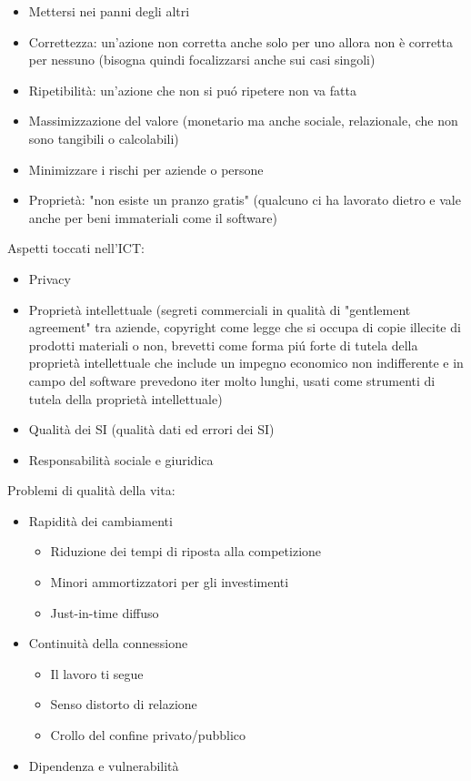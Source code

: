 \begin{itemize}

\item
  Mettersi nei panni degli altri
\item
  Correttezza: un'azione non corretta anche solo per uno allora non \`e
  corretta per nessuno (bisogna quindi focalizzarsi anche sui casi
  singoli)
\item
  Ripetibilit\`a: un'azione che non si pu\'o ripetere non va fatta
\item
  Massimizzazione del valore (monetario ma anche sociale, relazionale,
  che non sono tangibili o calcolabili)
\item
  Minimizzare i rischi per aziende o persone
\item
  Propriet\`a: "non esiste un pranzo gratis" (qualcuno ci ha lavorato
  dietro e vale anche per beni immateriali come il software)
\end{itemize}

Aspetti toccati nell'ICT:

\begin{itemize}

\item
  Privacy
\item
  Propriet\`a intellettuale (segreti commerciali in qualit\`a di
  "gentlement agreement" tra aziende, copyright come legge che si
  occupa di copie illecite di prodotti materiali o non, brevetti come
  forma pi\'u forte di tutela della propriet\`a intellettuale che include un
  impegno economico non indifferente e in campo del software prevedono
  iter molto lunghi, usati come strumenti di tutela della propriet\`a
  intellettuale)
\item
  Qualit\`a dei SI (qualit\`a dati ed errori dei SI)
\item
  Responsabilit\`a sociale e giuridica
\end{itemize}

Problemi di qualit\`a della vita:

\begin{itemize}

\item
  Rapidit\`a dei cambiamenti
  
  \begin{itemize}
    \item 
      Riduzione dei tempi di riposta alla competizione
    \item 
      Minori ammortizzatori per gli investimenti
    \item
      Just-in-time diffuso
  \end{itemize}
\item
  Continuit\`a della connessione
  \begin{itemize}
    
    \item 
      Il lavoro ti segue
    \item 
      Senso distorto di relazione
    \item 
      Crollo del confine privato/pubblico
  \end{itemize}
\item
  Dipendenza e vulnerabilit\`a
\end{itemize}

